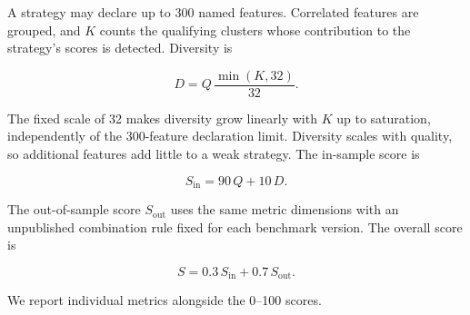 A strategy may declare up to 300 named features. Correlated features are grouped, and $K$ counts the qualifying clusters whose contribution to the strategy's scores is detected. Diversity is

\begin{equation}
D=Q\,\frac{\min(K,32)}{32}.
\label{eq:ed}
\end{equation}

The fixed scale of 32 makes diversity grow linearly with $K$ up to saturation, independently of the 300-feature declaration limit. Diversity scales with quality, so additional features add little to a weak strategy. The in-sample score is

\begin{equation}
S_{\mathrm{in}}=90\,Q+10\,D.
\label{eq:window}
\end{equation}

The out-of-sample score $S_{\mathrm{out}}$ uses the same metric dimensions with an unpublished combination rule fixed for each benchmark version. The overall score is

\begin{equation}
S=0.3\,S_{\mathrm{in}}+0.7\,S_{\mathrm{out}}.
\label{eq:total}
\end{equation}

We report individual metrics alongside the 0--100 scores.
